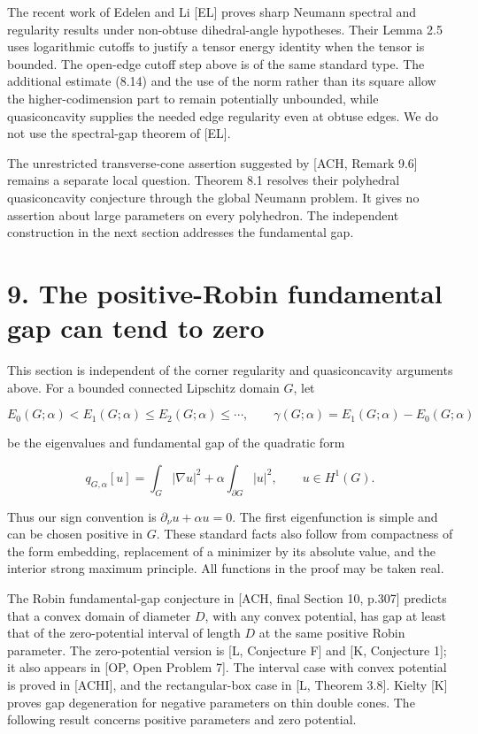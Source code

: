 \documentclass[11pt]{article}
\begin{document}
The recent work of Edelen and Li {[}EL{]} proves sharp Neumann spectral
and regularity results under non-obtuse dihedral-angle hypotheses. Their
Lemma 2.5 uses logarithmic cutoffs to justify a tensor energy identity
when the tensor is bounded. The open-edge cutoff step above is of the
same standard type. The additional estimate (8.14) and the use of the
norm rather than its square allow the higher-codimension part to remain
potentially unbounded, while quasiconcavity supplies the needed edge
regularity even at obtuse edges. We do not use the spectral-gap theorem
of {[}EL{]}.

The unrestricted transverse-cone assertion suggested by {[}ACH, Remark
9.6{]} remains a separate local question. Theorem 8.1 resolves their
polyhedral quasiconcavity conjecture through the global Neumann problem.
It gives no assertion about large parameters on every polyhedron. The
independent construction in the next section addresses the fundamental
gap.

\section{9. The positive-Robin fundamental gap can tend to
zero}\label{the-positive-robin-fundamental-gap-can-tend-to-zero}

This section is independent of the corner regularity and quasiconcavity
arguments above. For a bounded connected Lipschitz domain \(G\), let

\[
E_0(G;\alpha)<E_1(G;\alpha)\le E_2(G;\alpha)\le\cdots,
\qquad \gamma(G;\alpha)=E_1(G;\alpha)-E_0(G;\alpha)
\tag{9.1}
\]

be the eigenvalues and fundamental gap of the quadratic form

\[
q_{G,\alpha}[u]=\int_G|\nabla u|^2+\alpha\int_{\partial G}|u|^2,
\qquad u\in H^1(G).
\tag{9.2}
\]

Thus our sign convention is \(\partial_\nu u+\alpha u=0\). The first
eigenfunction is simple and can be chosen positive in \(G\). These
standard facts also follow from compactness of the form embedding,
replacement of a minimizer by its absolute value, and the interior
strong maximum principle. All functions in the proof may be taken real.

The Robin fundamental-gap conjecture in {[}ACH, final Section 10,
p.307{]} predicts that a convex domain of diameter \(D\), with any
convex potential, has gap at least that of the zero-potential interval
of length \(D\) at the same positive Robin parameter. The zero-potential
version is {[}L, Conjecture F{]} and {[}K, Conjecture 1{]}; it also
appears in {[}OP, Open Problem 7{]}. The interval case with convex
potential is proved in {[}ACHI{]}, and the rectangular-box case in {[}L,
Theorem 3.8{]}. Kielty {[}K{]} proves gap degeneration for negative
parameters on thin double cones. The following result concerns positive
parameters and zero potential.
\end{document}
